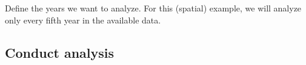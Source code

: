 \documentclass[12pt,twoside,openany]{reedthesis}
\newenvironment{Shaded}{\begin{snugshade}}{\end{snugshade}}
\newcommand{\CommentTok}[1]{\textcolor[rgb]{0.56,0.35,0.01}{\textit{#1}}}
\newcommand{\DecValTok}[1]{\textcolor[rgb]{0.00,0.00,0.81}{#1}}
\newcommand{\KeywordTok}[1]{\textcolor[rgb]{0.13,0.29,0.53}{\textbf{#1}}}
\newcommand{\NormalTok}[1]{#1}
\newcommand{\OperatorTok}[1]{\textcolor[rgb]{0.81,0.36,0.00}{\textbf{#1}}}
\newcommand{\StringTok}[1]{\textcolor[rgb]{0.31,0.60,0.02}{#1}}
\begin{document}
Define the years we want to analyze. For this (spatial) example, we will analyze only every fifth year in the available data.
\begin{Shaded}
\end{Shaded}
\hypertarget{conduct-analysis}{%
\subsection{Conduct analysis}\label{conduct-analysis}}
\end{document}
